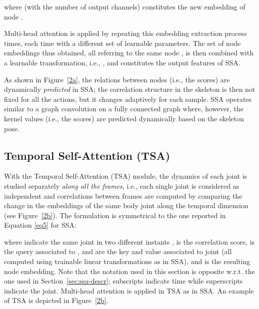 \documentclass[review]{cvpr}
\begin{document}
where  (with  the number of output channels) constitutes the new embedding of node .


Multi-head attention is applied by repeating this embedding extraction process  times, each time with a different set of learnable parameters. The set  of node embeddings thus obtained, all referring to the same node , is then combined with a learnable transformation, i.e., , and constitutes the output features of SSA.

As shown in Figure~\ref{2a}, the relations between nodes (i.e., the  scores) are dynamically \textit{predicted} in SSA; the correlation structure in the skeleton is then not fixed for all the actions, but it changes adaptively for each sample. SSA operates similar to a graph convolution on a fully connected graph where, however, the kernel values (i.e., the  scores) are predicted dynamically based on the skeleton pose.


\subsection{Temporal Self-Attention (TSA)}\label{sec:st}

With the Temporal Self-Attention (TSA) module, the dynamics of each joint is studied separately \textit{along all the frames}, i.e., each single joint is considered as independent and correlations between frames are computed by comparing the change in the embeddings of the same body joint along the temporal dimension (see Figure~\ref{2b}). The formulation is symmetrical to the one reported in Equation \eqref{eq5} for SSA:

where  indicate the same joint  in two different instants ,  is the correlation score,  is the query associated to ,  and  are the key and value associated to joint  (all computed using trainable linear transformations as in SSA), and  is the resulting node embedding. Note that  the notation used in this section is opposite w.r.t. the one used in Section~\ref{sec:ssa-descr}; subscripts indicate time while superscripts indicate the joint. Multi-head attention is applied in TSA as in SSA. An example of TSA is depicted in Figure~\ref{2b}.
\end{document}
